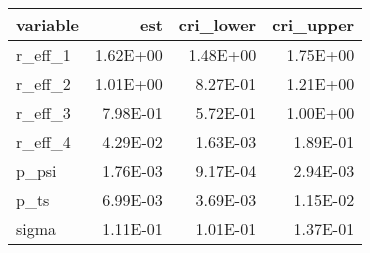 \begin{table}[ht]
\centering
\begin{tabular}{lrrr}
  \hline
variable & est & cri\_lower & cri\_upper \\ 
  \hline
r\_eff\_1 & 1.62E+00 & 1.48E+00 & 1.75E+00 \\ 
  r\_eff\_2 & 1.01E+00 & 8.27E-01 & 1.21E+00 \\ 
  r\_eff\_3 & 7.98E-01 & 5.72E-01 & 1.00E+00 \\ 
  r\_eff\_4 & 4.29E-02 & 1.63E-03 & 1.89E-01 \\ 
  p\_psi & 1.76E-03 & 9.17E-04 & 2.94E-03 \\ 
  p\_ts & 6.99E-03 & 3.69E-03 & 1.15E-02 \\ 
  sigma & 1.11E-01 & 1.01E-01 & 1.37E-01 \\ 
   \hline
\end{tabular}
\end{table}
